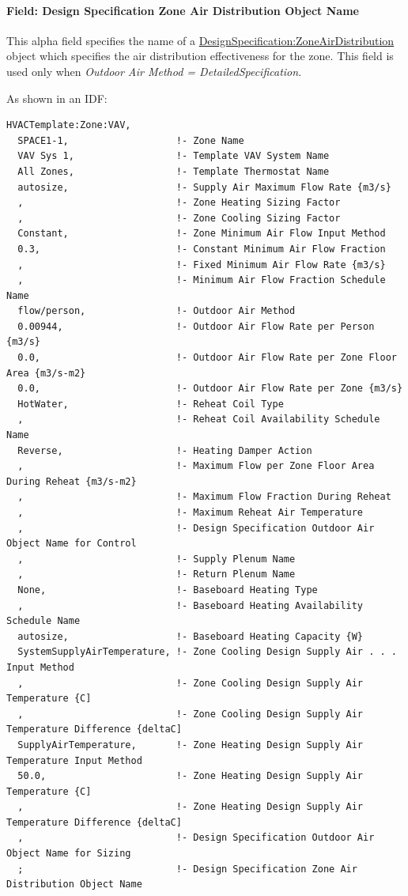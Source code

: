 \paragraph{Field: Design Specification Zone Air Distribution Object Name}\label{field-design-specification-zone-air-distribution-object-name-7}

This alpha field specifies the name of a \hyperref[designspecificationzoneairdistribution]{DesignSpecification:ZoneAirDistribution} object which specifies the air distribution effectiveness for the zone. This field is used only when \emph{Outdoor Air Method = DetailedSpecification}.

As shown in an IDF:

\begin{lstlisting}
HVACTemplate:Zone:VAV,
  SPACE1-1,                   !- Zone Name
  VAV Sys 1,                  !- Template VAV System Name
  All Zones,                  !- Template Thermostat Name
  autosize,                   !- Supply Air Maximum Flow Rate {m3/s}
  ,                           !- Zone Heating Sizing Factor
  ,                           !- Zone Cooling Sizing Factor
  Constant,                   !- Zone Minimum Air Flow Input Method
  0.3,                        !- Constant Minimum Air Flow Fraction
  ,                           !- Fixed Minimum Air Flow Rate {m3/s}
  ,                           !- Minimum Air Flow Fraction Schedule Name
  flow/person,                !- Outdoor Air Method
  0.00944,                    !- Outdoor Air Flow Rate per Person {m3/s}
  0.0,                        !- Outdoor Air Flow Rate per Zone Floor Area {m3/s-m2}
  0.0,                        !- Outdoor Air Flow Rate per Zone {m3/s}
  HotWater,                   !- Reheat Coil Type
  ,                           !- Reheat Coil Availability Schedule Name
  Reverse,                    !- Heating Damper Action
  ,                           !- Maximum Flow per Zone Floor Area During Reheat {m3/s-m2}
  ,                           !- Maximum Flow Fraction During Reheat
  ,                           !- Maximum Reheat Air Temperature
  ,                           !- Design Specification Outdoor Air Object Name for Control
  ,                           !- Supply Plenum Name
  ,                           !- Return Plenum Name
  None,                       !- Baseboard Heating Type
  ,                           !- Baseboard Heating Availability Schedule Name
  autosize,                   !- Baseboard Heating Capacity {W}
  SystemSupplyAirTemperature, !- Zone Cooling Design Supply Air . . . Input Method
  ,                           !- Zone Cooling Design Supply Air Temperature {C]
  ,                           !- Zone Cooling Design Supply Air Temperature Difference {deltaC]
  SupplyAirTemperature,       !- Zone Heating Design Supply Air Temperature Input Method
  50.0,                       !- Zone Heating Design Supply Air Temperature {C]
  ,                           !- Zone Heating Design Supply Air Temperature Difference {deltaC]
  ,                           !- Design Specification Outdoor Air Object Name for Sizing
  ;                           !- Design Specification Zone Air Distribution Object Name
\end{lstlisting}

